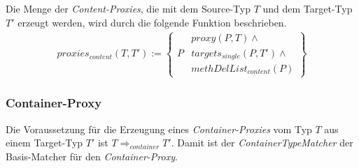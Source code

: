 \documentclass[a4paper,12pt]{article}
\begin{document}
Die Menge der \emph{Content-Proxies}, die mit dem Source-Typ $T$ und dem Target-Typ $T'$ erzeugt werden, wird durch die folgende Funktion beschrieben.
\begin{gather*}
\mathit{proxies_{content}(T,T')} := 
\left\{\begin{array}{l|l}
		& \mathit{proxy(P,T)} \wedge \mathit{ } \\
	P	& \mathit{targets_{single}(P,T')} \wedge \mathit{ }\\
		& \mathit{methDelList_{content}(P)} 
		 \end{array}
\right\}
\end{gather*}
\subsubsection{Container-Proxy}
Die Voraussetzung für die Erzeugung eines \emph{Container-Proxies} vom Typ $T$ aus einem Target-Typ $T'$ ist $T \Rightarrow_{container} T'$. Damit ist der \emph{ContainerTypeMatcher} der Basis-Matcher für den \emph{Container-Proxy}.
\end{document}
